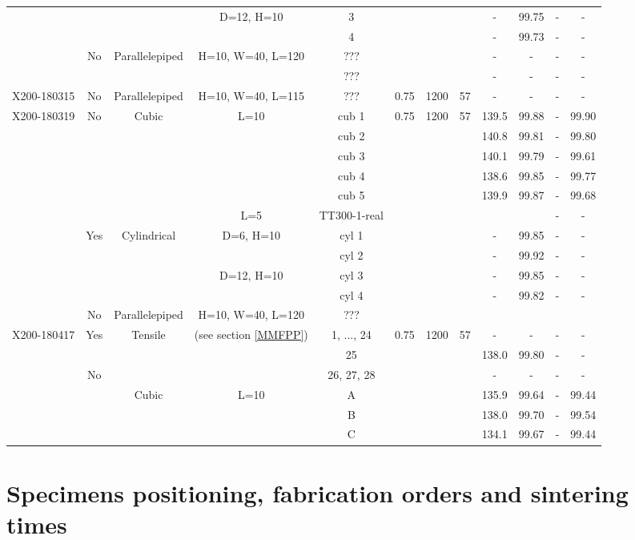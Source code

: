 \begin{center}
\begin{landscape}
\begin{savenotes}
\begin{longtable}{@{\extracolsep{\fill}}*{12}{|c}|@{}}
    & &  &D=12, H=10 &3& & & &- &99.75 & -& -\\
    & & & &4 & & & &- &99.73 &- &-\\
    & No & Parallelepiped & H=10, W=40, L=120 & ??? & & & &- &- &- &-\\
        &  & & & ??? & & & &- &- &- &-\\
\hline  
  X200-180315 & No & Parallelepiped & H=10, W=40, L=115& ??? & 0.75 & 1200 &57 &- &- &- &-\\
  \hline
  X200-180319  & No & Cubic & L=10 & cub 1 & 0.75 & 1200 &57 &139.5 & 99.88&- &99.90\\
  & &  & & cub 2 & & & &140.8 &99.81 &- &99.80\\
  & &  & & cub 3 & & & &140.1 &99.79 &- &99.61\\
  & & & & cub 4 & & & &138.6 &99.85 &- &99.77\\
  & & & & cub 5 & & & &139.9 &99.87 &- &99.68\\
  & & &  L=5& TT300-1-real &  & & & & &- &-\\ 
  & Yes &  Cylindrical & D=6, H=10&cyl 1   &  & & &- &99.85 &- &-\\
    & &  & &cyl 2 & & & & -&99.92 &- &-\\
    & &  & D=12, H=10 &cyl 3 & & & &- &99.85 &- &-\\
    & &  &  &cyl 4  & & & &- &99.82 &- &-\\
 & No & Parallelepiped & H=10, W=40, L=120 & ??? & & & & & & &\\ 
    \hline 
X200-180417 & Yes & Tensile & (see section \ref{MMFPP}) & 1, ..., 24 & 0.75 &1200 &57 & -& -& -&-\\
& &  & & 25 & && &138.0 &99.80 &- &-\\
& No &  & & 26, 27, 28 & && &- &- &- &-\\
&  & Cubic & L=10 & A & & & &135.9 &99.64 &- &99.44\\
&  & & & B & && &138.0 & 99.70& -&99.54\\
&  & & & C & && & 134.1&99.67 &- &99.44\\
\end{longtable}
\end{savenotes}
\end{landscape}
 \end{center}

\section{Specimens positioning, fabrication orders and sintering times}
\label{mda}
